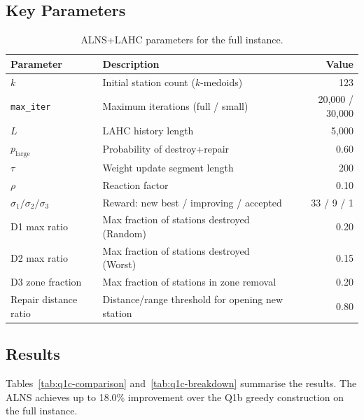 \documentclass[11pt,a4paper]{article}
\begin{document}
\subsection{Key Parameters}

\begin{table}[H]
\centering
\caption{ALNS+LAHC parameters for the full instance.}
\label{tab:alns-params}
\begin{tabular}{llr}
\toprule
Parameter & Description & Value \\
\midrule
$k$                              & Initial station count ($k$-medoids)              & 123 \\
\texttt{max\_iter}               & Maximum iterations (full / small)                & 20,000 / 30,000 \\
$L$                              & LAHC history length                              & 5,000 \\
$p_{\text{large}}$               & Probability of destroy+repair                    & 0.60 \\
$\tau$                           & Weight update segment length                     & 200 \\
$\rho$                           & Reaction factor                                  & 0.10 \\
$\sigma_1 / \sigma_2 / \sigma_3$ & Reward: new best / improving / accepted          & 33 / 9 / 1 \\
D1 max ratio                     & Max fraction of stations destroyed (Random)      & 0.20 \\
D2 max ratio                     & Max fraction of stations destroyed (Worst)       & 0.15 \\
D3 zone fraction                 & Max fraction of stations in zone removal         & 0.20 \\
Repair distance ratio            & Distance/range threshold for opening new station & 0.80 \\
\bottomrule
\end{tabular}
\end{table}

\subsection{Results}

Tables~\ref{tab:q1c-comparison} and~\ref{tab:q1c-breakdown} summarise the results.
The ALNS achieves up to 18.0\% improvement over the Q1b greedy construction on the full instance.
\end{document}
